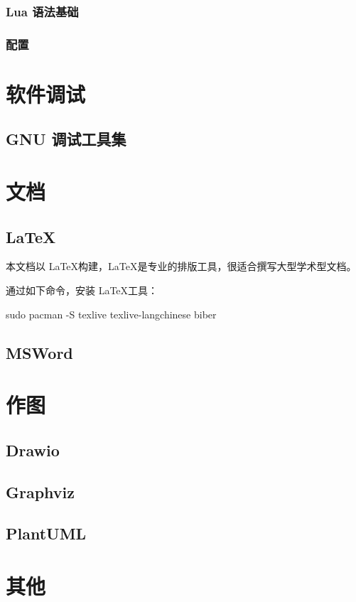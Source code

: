 \subsubsection{Lua 语法基础}

\subsubsection{配置}

\section{软件调试}
\subsection{GNU 调试工具集}

\section{文档}

\subsection{\LaTeX}

本文档以 \LaTeX 构建，\LaTeX 是专业的排版工具，很适合撰写大型学术型文档。


通过如下命令，安装 \LaTeX 工具：

\begin{lstcode}[numbers=none]
  sudo pacman -S texlive texlive-langchinese biber
\end{lstcode}

\subsection{MSWord}

\section{作图}
\subsection{Drawio}
\subsection{Graphviz}
\subsection{PlantUML}

\section{其他}
